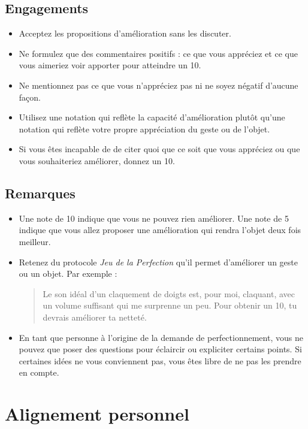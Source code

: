 \documentclass[paper=6in:9in,pagesize=pdftex,headinclude=on,footinclude=on,12pt]{scrbook}
\begin{document}
\subsection{Engagements}
\begin{itemize}
	\item Acceptez les propositions d'amélioration sans les discuter.
	\item Ne formulez que des commentaires positifs : ce que vous appréciez et ce que vous aimeriez voir apporter pour atteindre un 10.
	\item Ne mentionnez pas ce que vous n'appréciez pas ni ne soyez négatif d'aucune façon.
	\item Utilisez une notation qui reflète la capacité d'amélioration plutôt qu'une notation qui reflète votre propre appréciation du geste ou de l'objet.
	\item Si vous êtes incapable de de citer quoi que ce soit que vous appréciez ou que vous souhaiteriez améliorer, donnez un 10.
\end{itemize}

\subsection{Remarques}
\begin{itemize}
	\item Une note de 10 indique que vous ne pouvez rien améliorer. Une note de 5 indique que vous allez proposer une amélioration qui rendra l'objet deux fois meilleur.
	\item Retenez du protocole \emph{Jeu de la Perfection} qu'il permet d'améliorer un geste ou un objet. Par exemple :
	      \begin{quote}
	      	\og{}Le son idéal d'un claquement de doigts est, pour moi, claquant, avec un volume suffisant qui me surprenne un peu. Pour obtenir un 10, tu devrais
	        améliorer ta netteté.\fg{}
	      \end{quote}
	\item En tant que personne à l'origine de la demande de perfectionnement, vous ne pouvez que poser des questions pour éclaircir ou expliciter certains points.
	      Si certaines idées ne vous conviennent pas, vous êtes libre de ne pas les prendre en compte.
\end{itemize}

\section{Alignement personnel} \label{protocole-alignement-personnel}
\end{document}
